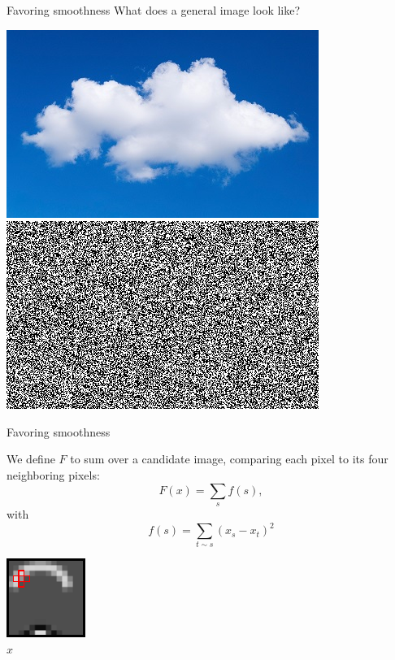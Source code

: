 \documentclass[10pt]{beamer}
\begin{document}
\begin{frame}{Favoring smoothness}
What does a general image look like?
\begin{center}
\includegraphics[scale=0.4]{img/cloud} \hspace{3em}
\includegraphics[scale=0.4]{img/static}
\end{center}

\end{frame}

\begin{frame}{Favoring smoothness}

We define $F$ to sum over a candidate image, comparing each pixel to its four neighboring pixels:
\[ F(x) = \sum_{s}f(s), \]
with 
\[f(s) = \sum_{t \sim s} (x_s - x_t)^2 \]

\pause
\begin{center}
\includegraphics[scale=1.7]{img/compare_neighbors1}
\\ $x$
\end{center}
\end{frame}
\end{document}
